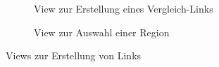 \documentclass[nomenclature, oneside, 150]{HSMW-Thesis}
\begin{document}
\begin{figure}[th]
\begin{subfigure}[t]{0.3\textwidth}
        			\caption{View zur Erstellung eines Vergleich-Links}
        			\label{fig:l2}
    			\end{subfigure}
    			\begin{subfigure}[t]{0.3\textwidth}
        			\caption{View zur Auswahl einer Region}
        			\label{fig:l3}
    			\end{subfigure}
    			\caption{Views zur Erstellung von Links}
				\label{fig:link1}
			\end{figure}
			
\end{document}
